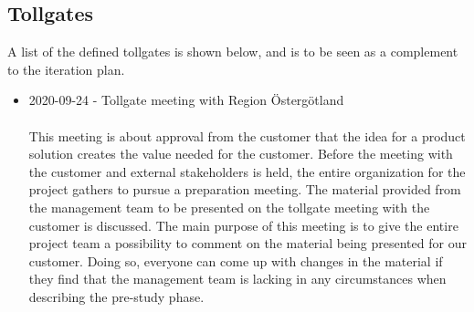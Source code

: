 \newpage
\subsection{Tollgates}
A list of the defined tollgates is shown below, and is to be seen as a complement to the iteration plan.
\begin{itemize}
    \item 2020-09-24 - Tollgate meeting with Region Östergötland\\ \\
    This meeting is about approval from the customer that the idea for a product solution creates the value needed for the customer. Before the meeting with the customer and external stakeholders is held, the entire organization for the project gathers to pursue a preparation meeting. The material provided from the management team to be presented on the tollgate meeting with the customer is discussed. The main purpose of this meeting is to give the entire project team a possibility to comment on the material being presented for our customer. Doing so, everyone can come up with changes in the material if they find that the management team is lacking in any circumstances when describing the pre-study phase. \\
    

\end{itemize}
